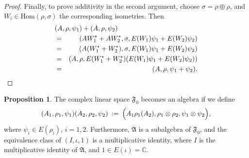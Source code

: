 \documentclass[12pt]{article}
\newcommand{\alg}[1]{\mathfrak{#1}}
\theoremstyle{definition}
\newtheorem{prop}[thm]{Proposition}
\theoremstyle{definition}
\theoremstyle{remark}
\def\7#1{{\mathbb #1}}
\newcommand{\Hom}{\mathrm{Hom}}
\begin{document}
\begin{proof}
Finally, to prove additivity in the second argument, choose $\sigma =\rho \oplus
\rho$, and $W_i\in \Hom (\rho ,\sigma )$ the corresponding isometries.  Then
\begin{eqnarray*}
  \lefteqn{ (A,\rho ,\psi _1)+(A,\rho ,\psi _2) } \\
  & =& (AW_1^*+AW_2^*,\sigma ,E(W_1)\psi _1+E(W_2)\psi _2 )  \\ 
  &=& (A(W_1^*+W_2^*),\sigma ,E(W_1)\psi _1+E(W_2)\psi _2 ) \\
  &=& (A,\rho ,E(W_1^*+W_2^*)(E(W_1)\psi _1+E(W_2)\psi _2 ) ) \\
  &=& (A,\rho ,\psi _1+\psi _2).\end{eqnarray*}  
\end{proof}

\begin{prop} The complex linear space $\alg{F}_0 $ becomes an algebra if we define
  \begin{equation} (A_1,\rho _1,\psi _1)(A_2,\rho _2,\psi _2)\: := \: \Bigl( A_1\rho
    _1(A_2),\rho _1\otimes \rho _2,\psi _1\otimes \psi _2 \Bigr) ,\label{multiply}
  \end{equation} where $\psi _i\in E(\rho _i)$, $i=1,2$.  Furthermore, $\alg{A}$ is a
  subalgebra of $\alg{F}_0 $, and the equivalence class of $(I,\iota ,1)$ is a
  multiplicative identity, where $I$ is the multiplicative identity of $\alg{A}$,
  and $1\in E(\iota )=\7C$.  \end{prop}
\end{document}
